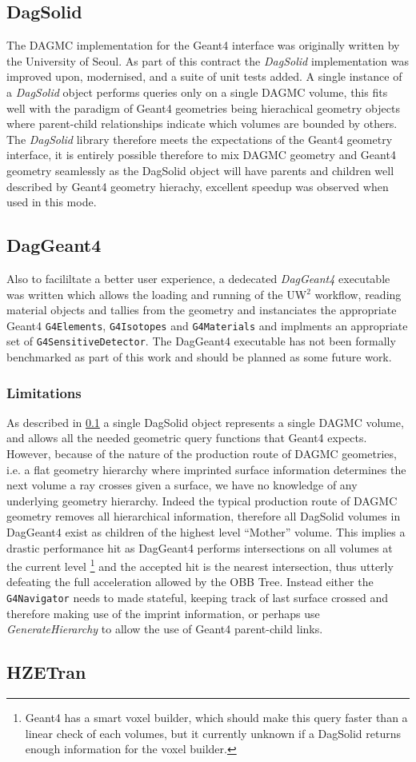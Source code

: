 \subsection{DagSolid}
\label{sec:dagsolid}
The DAGMC implementation for the Geant4 \cite{geant4} interface was originally written by the University of Seoul. 
As part of this contract the \textit{DagSolid} \cite{dag_geant4} implementation was improved upon, modernised,  and a 
suite of unit tests added. A single instance of a \textit{DagSolid} object performs queries only
on a single DAGMC volume, this fits well with the paradigm of Geant4 geometries being hierachical 
geometry objects where parent-child relationships indicate which volumes are bounded by others. 
The \textit{DagSolid} library therefore meets the expectations of the Geant4 geometry interface, it is
entirely possible therefore to mix DAGMC geometry and Geant4 geometry seamlessly as the DagSolid object
will have parents and children well described by Geant4 geometry hierachy, excellent speedup was observed
when used in this mode.
\subsection{DagGeant4}
\label{sec:daggeant4}
Also to facililtate a better user experience, a dedecated \textit{DagGeant4}  
executable was written which allows the loading and running of the UW$^2$ workflow, 
reading material objects and tallies from the geometry and instanciates the appropriate Geant4 
\texttt{G4Elements}, \texttt{G4Isotopes} and \texttt{G4Materials} and implments an appropriate 
set of \texttt{G4SensitiveDetector}. The DagGeant4 executable has not been formally benchmarked
as part of this work and should be planned as some future work. 
\subsubsection*{Limitations}
As described in \ref{sec:dagsolid} a single DagSolid object represents a single DAGMC volume, and allows
all the needed geometric query functions that Geant4 expects. However, because of the nature of the production
route of DAGMC geometries, i.e. a flat geometry hierarchy where imprinted surface information determines
the next volume a ray crosses given a surface, we have no knowledge of any underlying geometry hierarchy. 
Indeed the typical production route of DAGMC geometry removes all hierarchical information, therefore all 
DagSolid volumes in DagGeant4 exist as children of the highest level ``Mother'' volume. This implies a drastic
performance hit as DagGeant4 performs intersections on all volumes at the current level 
\footnote{Geant4 has a smart voxel builder, which should make this query faster than a linear check of 
each volumes, but it currently unknown if a DagSolid returns enough information for the voxel builder.}
and the accepted hit is the nearest intersection, thus utterly defeating the full acceleration allowed
by the OBB Tree. Instead either the \texttt{G4Navigator} needs to made stateful, keeping track of last surface
crossed and therefore making use of the imprint information, or perhaps use \textit{GenerateHierarchy} 
to allow the use of Geant4 parent-child links.
\subsection{HZETran}


